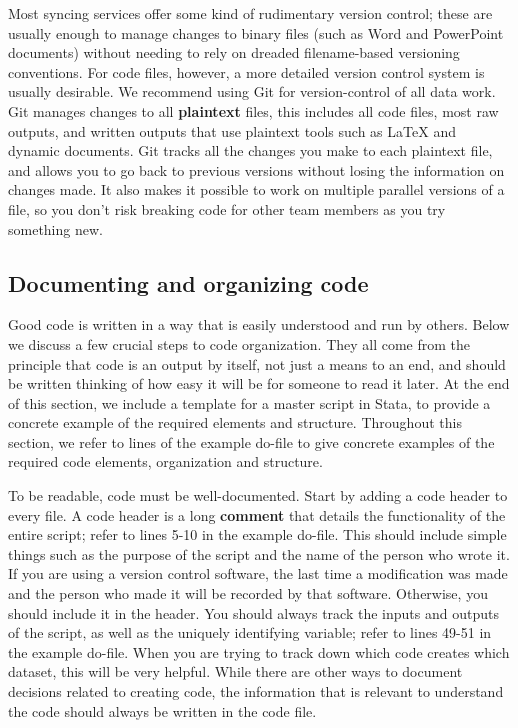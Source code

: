 Most syncing services offer some kind of rudimentary version control;
these are usually enough to manage changes to binary files (such as Word and PowerPoint documents)
without needing to rely on dreaded filename-based versioning conventions.
For code files, however, a more detailed version control system is usually desirable.
We recommend using Git for version-control of all data work.
Git manages changes to all \textbf{plaintext} files,
this includes all code files, most raw outputs,
and written outputs that use plaintext tools such as
{\LaTeX} and dynamic documents.\index{{\LaTeX}}
Git tracks all the changes you make to each plaintext file,
and allows you to go back to previous versions without losing the information on changes made.
It also makes it possible to work on multiple parallel versions of a file,
so you don't risk breaking code for other team members as you try something new.


\subsection{Documenting and organizing code}
Good code is written in a way that is easily understood and run by others.
Below we discuss a few crucial steps to code organization.
They all come from the principle that code is an output by itself,
not just a means to an end,
and should be written thinking of how easy it will be for someone to read it later.
At the end of this section, we include a template for a master script in Stata,
to provide a concrete example of the required elements and structure.
Throughout this section, we refer to lines of the example do-file
to give concrete examples of the required code elements, organization and structure.

To be readable, code must be well-documented.
Start by adding a code header to every file.
A code header is a long \textbf{comment}
that details the functionality of the entire script;
refer to lines 5-10 in the example do-file.
This should include simple things such as
the purpose of the script and the name of the person who wrote it.
If you are using a version control software,
the last time a modification was made and the person who made it will be recorded by that software.
Otherwise, you should include it in the header.
You should always track the inputs and outputs of the script,
as well as the uniquely identifying variable;
refer to lines 49-51 in the example do-file.
When you are trying to track down which code creates which dataset, this will be very helpful.
While there are other ways to document decisions related to creating code,
the information that is relevant to understand the code should always be written in the code file.

